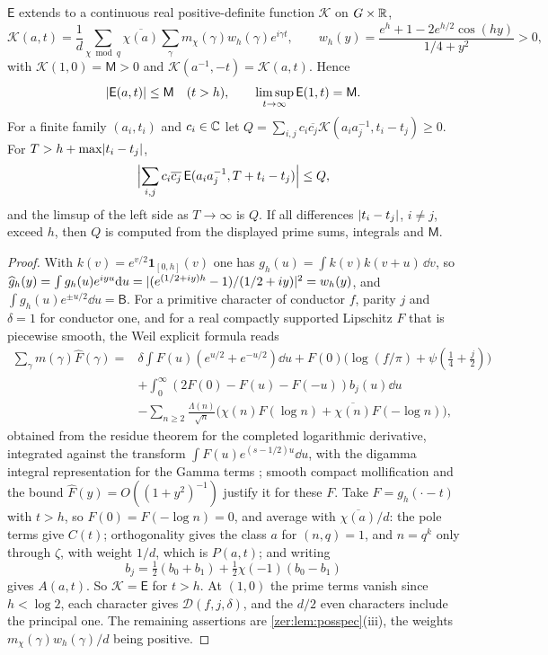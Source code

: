 \begin{theorem}\label{zer:thm:sharpwin}
$\mathsf E$ extends to a continuous real positive-definite function $\mathcal K$ on $G\times\mathbb{R}$,
\[
 \mathcal K(a,t)=\frac1d\sum_{\chi\bmod q}\overline{\chi(a)}\sum_\gamma m_\chi(\gamma)w_h(\gamma)e^{i\gamma t},\qquad
 w_h(y)=\frac{e^h+1-2e^{h/2}\cos(hy)}{1/4+y^2}>0,
\]
with $\mathcal K(1,0)=\mathsf M>0$ and $\mathcal K(a^{-1},-t)=\mathcal K(a,t)$. Hence
\[
 \lvert\mathsf E(a,t)\rvert\le\mathsf M\quad(t>h),\qquad\limsup_{t\to\infty}\mathsf E(1,t)=\mathsf M .
\]
For a finite family $(a_i,t_i)$ and $c_i\in\mathbb{C}$ let
$Q=\sum_{i,j}c_i\overline{c_j}\mathcal K(a_ia_j^{-1},t_i-t_j)\ge0$. For
$T>h+\max\lvert t_i-t_j\rvert$,
\[
 \Bigl|\sum_{i,j}c_i\overline{c_j}\,\mathsf E(a_ia_j^{-1},T+t_i-t_j)\Bigr|\le Q,
\]
and the limsup of the left side as $T\to\infty$ is $Q$. If all differences $\lvert t_i-t_j\rvert$, $i\ne j$,
exceed $h$, then $Q$ is computed from the displayed prime sums, integrals and $\mathsf M$.
\end{theorem}
\begin{proof}
With $k(v)=e^{v/2}\mathbf 1_{[0,h]}(v)$ one has $g_h(u)=\int k(v)k(v+u)\,\dd v$, so
$\widehat g_h(y)=\int g_h(u)e^{iyu}\mathrm{d} u=\lvert(e^{(1/2+iy)h}-1)/(1/2+iy)\rvert^2=w_h(y)$, and
$\int g_h(u)e^{\pm u/2}\dd u=\mathsf B$. For a primitive character of conductor $f$, parity $j$ and
$\delta=1$ for conductor one, and for a real compactly supported Lipschitz $F$ that is piecewise
smooth, the Weil explicit formula reads
\begin{align*}
 \sum_\gamma m(\gamma)\widehat F(\gamma)={}&\delta\int F(u)(e^{u/2}+e^{-u/2})\dd u
 +F(0)\bigl(\log(f/\pi)+\psi(\tfrac14+\tfrac j2)\bigr)\\
 &+\int_0^\infty(2F(0)-F(u)-F(-u))b_j(u)\dd u\\
 &-\sum_{n\ge2}\frac{\Lambda(n)}{\sqrt n}\bigl(\chi(n)F(\log n)+\overline{\chi(n)}F(-\log n)\bigr),
\end{align*}
obtained from the residue theorem for the completed logarithmic derivative, integrated
against the transform $\int F(u)e^{(s-1/2)u}\dd u$, with the digamma integral representation for the Gamma
terms \cite{Koukoulopoulos2019Distribution}; smooth compact mollification and the bound
$\widehat F(y)=O((1+y^2)^{-1})$ justify it for these $F$. Take $F=g_h(\cdot-t)$ with $t>h$, so
$F(0)=F(-\log n)=0$, and average with $\overline{\chi(a)}/d$: the pole terms give $C(t)$;
orthogonality gives the class $a$ for $(n,q)=1$, and $n=q^k$ only through $\zeta$, with weight
$1/d$, which is $P(a,t)$; and writing
\[
 b_j=\tfrac12(b_0+b_1)+\tfrac12\chi(-1)(b_0-b_1)
\]
gives $A(a,t)$.
So $\mathcal K=\mathsf E$ for $t>h$. At $(1,0)$ the prime terms vanish since $h<\log2$, each character
gives $\mathcal D(f,j,\delta)$, and the $d/2$ even characters include the principal one. The
remaining assertions are \cref{zer:lem:posspec}(iii), the weights $m_\chi(\gamma)w_h(\gamma)/d$ being
positive.
\end{proof}

